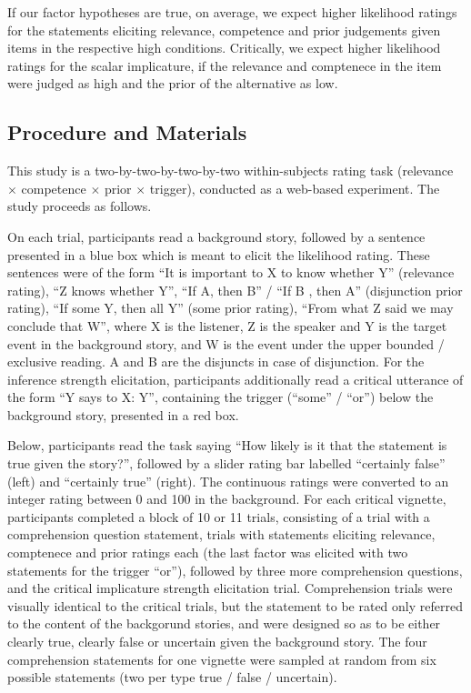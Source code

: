 \documentclass{sp}
\begin{document}
If our factor hypotheses are true, on average, we expect higher likelihood ratings for the statements eliciting relevance, competence and prior judgements given items in the respective high conditions. Critically, we expect higher likelihood ratings for the scalar implicature, if the relevance and comptenece in the item were judged as high and the prior of the alternative as low.


\subsection{Procedure and Materials}
This study is a two-by-two-by-two-by-two within-subjects rating task (relevance $\times$ competence $\times$ prior $\times$ trigger), conducted as a web-based experiment. The study proceeds as follows.

On each trial, participants read a background story, followed by a sentence presented in a blue box which is meant to elicit the likelihood rating. These sentences were of the form ``It is important to X to know whether Y'' (relevance rating), ``Z knows whether Y'', ``If A, then B'' / ``If B , then A'' (disjunction prior rating), ``If some Y, then all Y'' (some prior rating), ``From what Z said we may conclude that W'', where X is the listener, Z is the speaker and Y is the target event in the background story, and W is the event under the upper bounded / exclusive reading. A and B are the disjuncts in case of disjunction. For the inference strength elicitation, participants additionally read a critical utterance of the form ``Y says to X: Y'', containing the trigger (``some'' / ``or'') below the background story, presented in a red box. 
 
Below, participants read the task saying ``How likely is it that the statement is true given the story?'', followed by a slider rating bar labelled ``certainly false'' (left) and ``certainly true'' (right). The continuous ratings were converted to an integer rating between 0 and 100 in the background. For each critical vignette, participants completed a block of 10 or 11 trials, consisting of a trial with a comprehension question statement, trials with statements eliciting relevance, comptenece and prior ratings each (the last factor was elicited with two statements for the trigger ``or''), followed by three more comprehension questions, and the critical implicature strength elicitation trial. 
Comprehension trials were visually identical to the critical trials, but the statement to be rated only referred to the content of the backgorund stories, and were designed so as to be either clearly true, clearly false or uncertain given the background story. 
The four comprehension statements for one vignette were sampled at random from six possible statements (two per type true / false / uncertain). 
 
\end{document}
